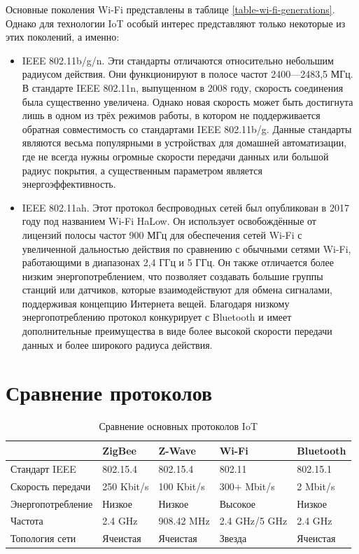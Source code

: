 	Основные поколения Wi-Fi представлены в таблице \ref{table-wi-fi-generations}. Однако для технологии 
	IoT особый интерес представляют только некоторые из этих поколений, а именно:
	
	\begin{itemize}
		\item IEEE 802.11b/g/n. Эти стандарты отличаются относительно небольшим радиусом действия.
		Они функционируют в полосе частот 2400—2483,5 МГц. В стандарте  IEEE 802.11n, выпущенном
		в 2008 году, скорость соединения была существенно увеличена. Однако новая скорость может
		быть достигнута лишь в одном из трёх режимов работы, в котором не поддерживается обратная
		совместимость со стандартами IEEE 802.11b/g. Данные стандарты являются весьма популярными
		в устройствах для домашней автоматизации, где не всегда нужны огромные скорости передачи
		данных или большой радиус покрытия, а существенным параметром является энергоэффективность.
		\item IEEE 802.11ah. Этот протокол беспроводных сетей был опубликован в 2017 году под названием 
		Wi-Fi HaLow. Он использует освобождённые от лицензий полосы частот 900 МГц для обеспечения 
		сетей Wi-Fi с увеличенной дальностью действия по сравнению с обычными сетями Wi-Fi, работающими 
		в диапазонах 2,4 ГГц и 5 ГГц. Он также отличается более низким энергопотреблением, что позволяет 
		создавать большие группы станций или датчиков, которые взаимодействуют для обмена сигналами, 
		поддерживая концепцию Интернета вещей. Благодаря низкому энергопотреблению протокол конкурирует 
		с Bluetooth и имеет дополнительные преимущества в виде более высокой скорости передачи данных 
		и более широкого радиуса действия.
	\end{itemize}
	
	
	\section{Сравнение протоколов}
	
	\begin{table}[h]
		\centering
		\caption{Сравнение основных протоколов IoT}
		\begin{tabular}{ | l | l | l | l | l | }
			\hline
			 & ZigBee & Z-Wave & Wi-Fi & Bluetooth \\ \hline
			Стандарт IEEE & 802.15.4 & 802.15.4 & 802.11 & 802.15.1 \\ \hline
			Скорость передачи & 250 Kbit/s & 100 Kbit/s & 300+ Mbit/s & 2 Mbit/s \\ \hline
			Энергопотребление & Низкое & Низкое & Высокое & Низкое \\ \hline
			Частота & 2.4 GHz  & 908.42 MHz & 2.4 GHz/5 GHz & 2.4 GHz \\ \hline
			Топология сети & Ячеистая & Ячеистая & Звезда & Ячеистая \\
			\hline
		\end{tabular}
		\label{table-IoT-protocols-comparison}
	\end{table}

